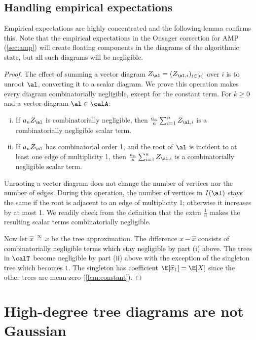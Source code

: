\documentclass[12pt]{article}
\newcommand{\eqinf}{\,\overset{\infty}{=}\,}
\begin{document}
\subsection{Handling empirical expectations}
\label{sec:onsager-correction}

Empirical expectations are highly concentrated and the following lemma confirms this.
Note that the empirical expectations in the Onsager correction for AMP (\cref{sec:amp}) will create floating
components in the diagrams of the algorithmic state, but all such diagrams will be negligible.


\empiricalExpectation*

\begin{proof}
The effect of summing a vector diagram $Z_\al=(Z_{\al,i})_{i\in [n]}$ over $i$ is to unroot $\al$, converting it to a scalar diagram. We prove this operation makes every diagram combinatorially negligible,
except for the constant term.
For $k \geq 0$ and a vector diagram $\al \in \calA$:
    \begin{enumerate}[(i)]
        \item If $a_n Z_\al$ is combinatorially negligible,
        then $\frac{a_n}{n}\sum_{i=1}^n Z_{\al,i}$ is a combinatorially negligible scalar term.
        \item If $a_n Z_\al$ has combinatorial order 1,
        and the root of $\al$ is incident to at least
        one edge of multiplicity 1,
        then $\frac{a_n}{n}\sum_{i=1}^n Z_{\al,i}$ is a combinatorially negligible scalar term.
    \end{enumerate}
    Unrooting a vector diagram does not change the number of vertices nor the number of edges. During this operation, the number of vertices in $I(\al)$ stays the same if the root is adjacent to an edge of multiplicity 1; otherwise it increases by at most 1. We readily check from the definition that the extra $\frac{1}{n}$ makes the resulting scalar terms combinatorially negligible.


Now let $\widehat{x} \eqinf x$ be the tree approximation.
The difference $x - \widehat{x}$ consists of combinatorially negligible terms
which stay negligible by part (i) above.
The trees in $\calT$ become negligible by part (ii) above with the exception of
the singleton tree which becomes $1$.
The singleton has coefficient $\E[\widehat{x}_1] = \E[X]$ since the other trees
are mean-zero (\cref{lem:constant}).
\end{proof}
 
\section{High-degree tree diagrams are not Gaussian}
\label{sec:star}
\end{document}

